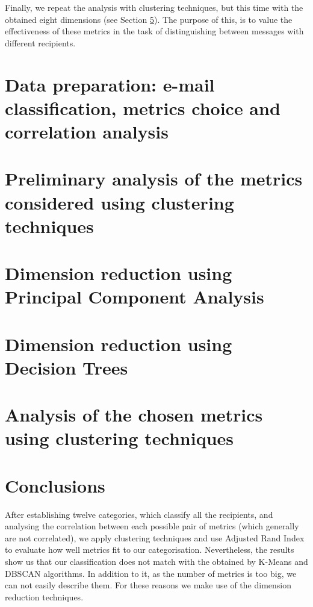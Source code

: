 Finally, we repeat the analysis with clustering techniques, but this time with the obtained eight dimensions (see Section \ref{sect:clust2}). The purpose of this, is to value the effectiveness of these metrics in the task of distinguishing between messages with different recipients.

\section{Data preparation: e-mail classification, metrics choice and correlation analysis}\label{sect:DatPrep}


\section{Preliminary analysis of the metrics considered using clustering techniques}\label{sect:clust1}


\section{Dimension reduction using Principal Component Analysis}\label{sect:pca}


\section{Dimension reduction using Decision Trees}\label{sect:dectrees}


\section{Analysis of the chosen metrics using clustering techniques}\label{sect:clust2}


\section{Conclusions}
After establishing twelve categories, which classify all the recipients, and analysing the correlation between each possible pair of metrics (which generally are not correlated), we apply clustering techniques and use Adjusted Rand Index to evaluate how well metrics fit to our categorisation. Nevertheless, the results show us that our classification does not match with the obtained by K-Means and DBSCAN algorithms. In addition to it, as the number of metrics is too big, we can not easily describe them. For these reasons we make use of the dimension reduction techniques.


